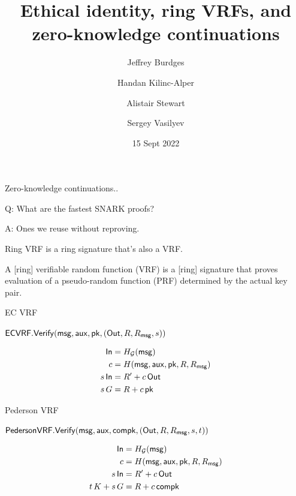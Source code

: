 \documentclass{beamer}
\title{Ethical identity, ring VRFs, and \\ zero-knowledge continuations}
\author{Jeffrey Burdges \and Handan Kilinc-Alper \and Alistair Stewart \and Sergey Vasilyev}
\date{15 Sept 2022}
\def\compk{\ensuremath{\mathsf{compk}}\xspace}
\begin{document}
\maketitle


\begin{frame}

Zero-knowledge continuations..
	
\bigskip

Q: What are the fastest SNARK proofs?

\bigskip

A: Ones we reuse without reproving.

\end{frame}



\begin{frame}

Ring VRF is a ring signature that's also a VRF.

\bigskip 

A [ring] verifiable random function (VRF) is a [ring] signature that proves evaluation of a pseudo-random function (PRF) determined by the actual key pair.


\end{frame}



\begin{frame}{EC VRF}

$\mathsf{ECVRF}.{\mathsf{Verify}}(\mathsf{msg},\mathsf{aux},\mathsf{pk},({\mathsf{Out}},R,R_\mathsf{msg},s))$

$$ \begin{aligned}
{\ensuremath{\mathsf{In}}} &= H_{\mathcal{G}}(\mathsf{msg}) \\
c &= H(\mathsf{msg},\mathsf{aux},\mathsf{pk},R,R_\mathsf{msg}) \\
s \, {\mathsf{In}} &= R' + c \, {\mathsf{Out}} \\
s \, G &= R + c \, \mathsf{pk} \\
\end{aligned} $$

\end{frame}



\begin{frame}{Pederson VRF}
	
$\mathsf{PedersonVRF}.\Verify(\msg,\aux,\compk,(\Out,R,R_\msg,s,t))$
	
$$ \begin{aligned}
\In &= H_{\mathcal{G}}(\msg) \\
c &= H(\msg,\aux,\pk,R,R_\msg) \\
s \, \In &= R' + c \, \Out \\
t \, K + s \, G &= R + c \, \compk \\
\end{aligned} $$
	
\end{frame}
\end{document}

